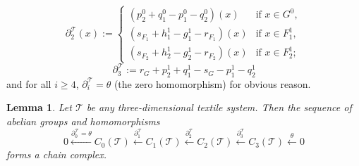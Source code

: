\documentclass[a4paper,reqno,12pt]{amsart}
\newtheorem{lem}[thm]{Lemma}
\theoremstyle{definition}
\theoremstyle{remark}
\def\mT{\mathcal{T}}
\begin{document}
\[
\partial_2^\mT(x):=
	\left\{
	\begin{array}{lll}
		(p_2^0+q_1^0-p_1^0-q_2^0)(x)  & \mbox{if } x\in G^0,\\
		(s_{F_1}+h_1^1-g_1^1-r_{F_1})(x)  & \mbox{if } x\in F_1^1,\\
        (s_{F_2}+h_2^1-g_2^1-r_{F_2})(x)  & \mbox{if } x\in F_2^1;
	\end{array}
	\right.
\]
\[
\partial_3^\mT:=r_G+p_2^1+q_1^1-s_G-p_1^1-q_2^1
\]
and for all $i\ge 4$, $\partial_i^\mT=\theta$ (the zero homomorphism) for obvious reason. 
\begin{lem}\label{lem chain complex}
Let $\mT$ be any three-dimensional textile system. Then the sequence of abelian groups and homomorphisms \[0\overset{\partial_0^\mT=\theta}{\longleftarrow} C_0(\mT)\overset{\partial_1^\mT}{\longleftarrow} C_1(\mT)\overset{\partial_2^\mT}{\longleftarrow} C_2(\mT)\overset{\partial_3^\mT}{\longleftarrow}C_3(\mT)\overset{\theta}{\longleftarrow} 0\] forms a chain complex. 
\end{lem}
\end{document}
